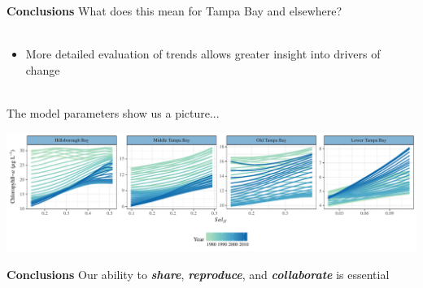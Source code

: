 \documentclass[serif]{beamer}\usepackage[]{graphicx}\usepackage[]{color}
\newcommand{\emtxt}[1]{\textbf{\textit{#1}}}
\begin{document}
\begin{frame}[t]{\textbf{Conclusions}}
\onslide<+->
What does this mean for Tampa Bay and elsewhere?\\~\\
\vspace{-0.2in}
\begin{itemize}
\item More detailed evaluation of trends allows greater insight into drivers of change\\~\\
\end{itemize}
\onslide<+->
The model parameters show us a picture...
\centerline{\includegraphics[width = \textwidth]{fig/title_plo.pdf}}
\end{frame}

\begin{frame}{\textbf{Conclusions}}
Our ability to \emtxt{share}, \emtxt{reproduce}, and \emtxt{collaborate} is essential \\~\\
\end{frame}
\end{document}
